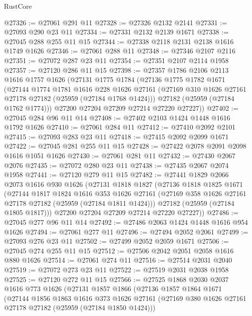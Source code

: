 \begin{lexlean}{RustCore}
\begin{coremodule}
@27326 := @27061 @291 @11
@27328 := @27326 @2132 @2141
@27331 := @27093 @290 @23 @11
@27334 := @27331 @2132 @2139 @1671
@27338 := @27045 @288 @255 @11 @15
@27344 := @27338 @2118 @2131 @2138 @1616 @1749 @1626
@27346 := @27061 @288 @11
@27348 := @27346 @2107 @2116
@27351 := @27072 @287 @23 @11
@27354 := @27351 @2107 @2114 @1958
@27357 := @27120 @286 @11 @15
@27398 := @27357
    @1786
    @2106
    @2113
    @1616
    @1757
    @1626
    (@27131
      @1775
      @1784
      (@27136
        @1775
        @1782
        @1671
        (@27144
          @1774
          @1781
          @1616
          @228
          @1626
          @27161
          (@27169 @310 @1626 @27161 @27178 @27182 (@25959 (@27184 @1768 @1424)))
          @27182
          (@25959 (@27184 @1762 @1774)))
        @27200
        @27204
        @27209
        @27214
        @27220
        @27227))
@27402 := @27045 @284 @96 @11 @14
@27408 := @27402 @2103 @1424 @1448 @1616 @1792 @1626
@27410 := @27061 @284 @11
@27412 := @27410 @2092 @2101
@27415 := @27093 @283 @23 @11
@27418 := @27415 @2092 @2099 @1671
@27422 := @27045 @281 @255 @11 @15
@27428 := @27422 @2078 @2091 @2098 @1616 @1051 @1626
@27430 := @27061 @281 @11
@27432 := @27430 @2067 @2076
@27435 := @27072 @280 @23 @11
@27438 := @27435 @2067 @2074 @1958
@27441 := @27120 @279 @11 @15
@27482 := @27441
    @1829
    @2066
    @2073
    @1616
    @930
    @1626
    (@27131
      @1818
      @1827
      (@27136
        @1818
        @1825
        @1671
        (@27144
          @1817
          @1824
          @1616
          @353
          @1626
          @27161
          (@27169 @358 @1626 @27161 @27178 @27182 (@25959 (@27184 @1811 @1424)))
          @27182
          (@25959 (@27184 @1805 @1817)))
        @27200
        @27204
        @27209
        @27214
        @27220
        @27227))
@27486 := @27045 @277 @96 @11 @14
@27492 := @27486 @2063 @1424 @1448 @1616 @954 @1626
@27494 := @27061 @277 @11
@27496 := @27494 @2052 @2061
@27499 := @27093 @276 @23 @11
@27502 := @27499 @2052 @2059 @1671
@27506 := @27045 @274 @255 @11 @15
@27512 := @27506 @2042 @2051 @2058 @1616 @880 @1626
@27514 := @27061 @274 @11
@27516 := @27514 @2031 @2040
@27519 := @27072 @273 @23 @11
@27522 := @27519 @2031 @2038 @1958
@27525 := @27120 @272 @11 @15
@27566 := @27525
    @1868
    @2030
    @2037
    @1616
    @773
    @1626
    (@27131
      @1857
      @1866
      (@27136
        @1857
        @1864
        @1671
        (@27144
          @1856
          @1863
          @1616
          @373
          @1626
          @27161
          (@27169 @380 @1626 @27161 @27178 @27182 (@25959 (@27184 @1850 @1424)))

\end{coremodule}
\end{lexlean}
